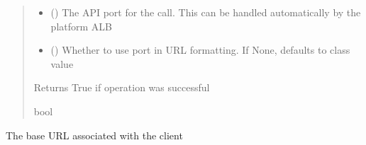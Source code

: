 \documentclass[letterpaper,10pt,english]{sphinxmanual}
\begin{document}
\begin{fulllineitems}
\begin{fulllineitems}
\begin{quote}
\begin{description}
\begin{itemize}
\item {} 
\sphinxAtStartPar
{} (\sphinxstyleliteralemphasis{\sphinxupquote{ (}}\sphinxstyleliteralemphasis{\sphinxupquote{)}}) \textendash{} The API port for the call. This can be handled automatically by the platform ALB

\item {} 
\sphinxAtStartPar
{} (\sphinxstyleliteralemphasis{\sphinxupquote{ (}}\sphinxstyleliteralemphasis{\sphinxupquote{)}}) \textendash{} Whether to use port in URL formatting. If None, defaults to class value

\end{itemize}

\sphinxAtStartPar
{} \textendash{} Returns True if operation was successful

\sphinxAtStartPar
bool

\end{description}\end{quote}

\end{fulllineitems}


\begin{fulllineitems}
\label{\detokenize{aisquared.platform:aisquared.platform.AISquaredPlatformClient.AISquaredPlatformClient.base_url}}
\pysigstartsignatures
{}
\pysigstopsignatures
\sphinxAtStartPar
The base URL associated with the client

\end{fulllineitems}



\end{fulllineitems}
\end{document}
